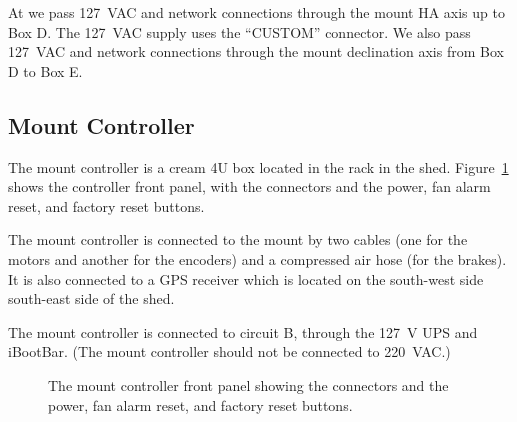 \ifddotioan
At {\projectname} we pass 127~VAC and network connections through the mount HA axis up to Box D. The 127~VAC supply uses the “CUSTOM” connector. We also pass 127~VAC and network connections through the mount declination axis from Box D to Box E.
\fi

\subsection{Mount Controller}

The mount controller is a cream 4U box located in the rack in the shed. 
Figure~\ref{figure:mount-controller-panel} shows the controller front panel, with the connectors and the power, fan alarm reset, and factory reset buttons.

The mount controller is connected to the mount by two cables (one for the motors and another for the encoders) and a compressed air hose (for the brakes). It is also connected to a GPS receiver which is located on the
\ifcoatlioan
south-west side
\fi
\ifddotioan
south-east side
\fi
of the shed.

The mount controller is connected to circuit B, through the 127~V UPS and iBootBar. (The mount controller should not be connected to 220~VAC.)

\begin{figure}
\begin{center}
\end{center}
\caption{The mount controller front panel showing the connectors and the power, fan alarm reset, and factory reset buttons.}
\label{figure:mount-controller-panel}
\end{figure}

